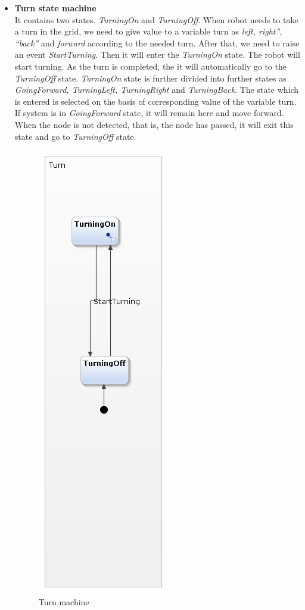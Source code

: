\documentclass[a4paper,12pt,oneside]{book}
\begin{document}
\begin{itemize}
\item \textbf{Turn state machine}\\
It contains two states. \textit{TurningOn} and \textit{TurningOff}. When robot needs to take a turn in the grid, we need to give value to a variable turn as \textit{left, right”, “back”} and \textit{forward} according to the needed turn. After that, we need to raise an event \textit{StartTurning}. Then it will enter the \textit{TurningOn} state. The robot will start turning. As the turn is completed, the it will automatically go to the \textit{TurningOff} state.
\textit{TurningOn} state is further divided into further states as \textit{GoingForward, TurningLeft, TurningRight} and \textit{TurningBack}.
The state which is entered is selected on the basis of corresponding value of the variable turn.
If system is in \textit{GoingForward} state, it will remain here and move forward. When the node is not detected, that is, the node has passed, it will exit this state and go to \textit{TurningOff} state.
	\begin{figure}[h]
	\centering
	\includegraphics[scale=.6]{turn.png}
	\caption{Turn machine}
\end{figure}


\end{itemize}
\end{document}
